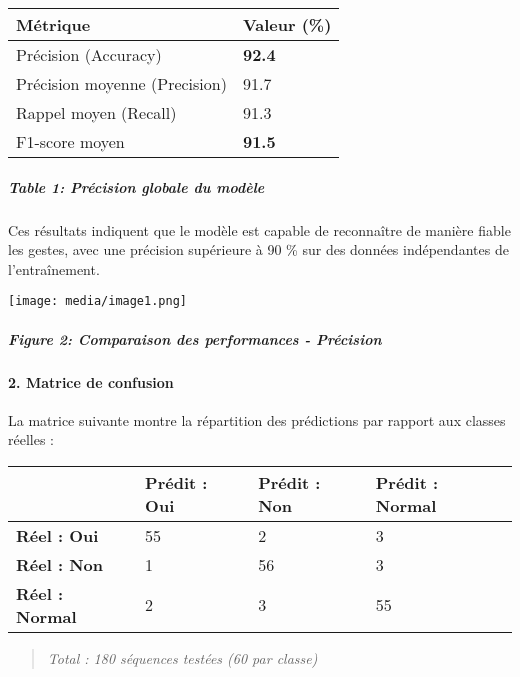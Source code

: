 \documentclass[
]{article}
\begin{document}
\begin{longtable}[]{@{}ll@{}}
\toprule
\textbf{Métrique} & \textbf{Valeur (\%)} \\
\midrule
\endhead
Précision (Accuracy) & \textbf{92.4} \\
Précision moyenne (Precision) & 91.7 \\
Rappel moyen (Recall) & 91.3 \\
F1-score moyen & \textbf{91.5} \\
\bottomrule
\end{longtable}

\hypertarget{table-1-pruxe9cision-globale-du-moduxe8le}{%
\subparagraph{Table 1: Précision globale du modèle}\label{table-1-pruxe9cision-globale-du-moduxe8le}}

Ces résultats indiquent que le modèle est capable de reconnaître de manière fiable les gestes, avec une précision supérieure à 90 \% sur des données indépendantes de l'entraînement.

\texttt{[image: media/image1.png]}

\hypertarget{figure-2-comparaison-des-performances---pruxe9cision}{%
\subparagraph{Figure 2: Comparaison des performances - Précision}\label{figure-2-comparaison-des-performances---pruxe9cision}}

\hypertarget{matrice-de-confusion}{%
\paragraph{\texorpdfstring{\textbf{2. Matrice de confusion}}{2. Matrice de confusion}}\label{matrice-de-confusion}}

La matrice suivante montre la répartition des prédictions par rapport aux classes réelles :

\begin{longtable}[]{@{}llll@{}}
\toprule
& \textbf{Prédit : Oui} & \textbf{Prédit : Non} & \textbf{Prédit : Normal} \\
\midrule
\endhead
\textbf{Réel : Oui} & 55 & 2 & 3 \\
\textbf{Réel : Non} & 1 & 56 & 3 \\
\textbf{Réel : Normal} & 2 & 3 & 55 \\
\bottomrule
\end{longtable}

\begin{quote}
\emph{Total : 180 séquences testées (60 par classe)}
\end{quote}
\end{document}
